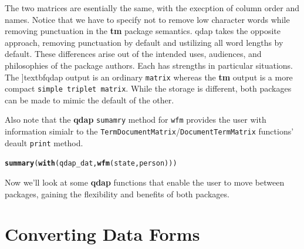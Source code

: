 \documentclass{article}\usepackage[]{graphicx}\usepackage[]{color}
\makeatletter
\newcommand{\hlstd}[1]{\textcolor[rgb]{0.345,0.345,0.345}{#1}}%
\newcommand{\hlkwd}[1]{\textcolor[rgb]{0.737,0.353,0.396}{\textbf{#1}}}%
\newenvironment{kframe}{%
 \def\at@end@of@kframe{}%
 \ifinner\ifhmode%
  \def\at@end@of@kframe{\end{minipage}}%
  \begin{minipage}{\columnwidth}%
 \fi\fi%
 \def\FrameCommand##1{\hskip\@totalleftmargin \hskip-\fboxsep
 \colorbox{shadecolor}{##1}\hskip-\fboxsep
     \hskip-\linewidth \hskip-\@totalleftmargin \hskip\columnwidth}%
 \MakeFramed {\advance\hsize-\width
   \@totalleftmargin\z@ \linewidth\hsize
   \@setminipage}}%
 {\par\unskip\endMakeFramed%
 \at@end@of@kframe}
\newenvironment{knitrout}{}{} %
\makeatother
\begin{document}
The two matrices are esentially the same, with the execption of column order and names.  Notice that we have to specify not to remove low character words while removing punctuation in the \textbf{tm} package semantics.  qdap takes the opposite approach, removing punctuation by default and ustilizing all word lengths by default.  These differences arise out of the intended uses, audiences, and philosophies of the package authors.  Each has strengths in particular situations.  The ]textbf{qdap} output is an ordinary \texttt{matrix} whereas the \textbf{tm} output is a more compact \texttt{simple triplet matrix}.  While the storage is different, both packages can be made to mimic the default of the other.  

Also note that the \textbf{qdap} \texttt{sumamry} method for \texttt{wfm} provides the user with information simialr to the \texttt{TermDocumentMatrix}/\texttt{DocumentTermMatrix} functions' deault \texttt{print} method.

\begin{knitrout}
\color{fgcolor}\begin{kframe}
\begin{alltt}
\hlkwd{summary}\hlstd{(}\hlkwd{with}\hlstd{(qdap_dat,} \hlkwd{wfm}\hlstd{(state, person)))}
\end{alltt}


{\ttfamily\noindent\itshape\color{messagecolor}{\#\# A word-frequency matrix (16 terms, 5 groups)\\\#\# \\\#\# \\\#\# Non-/sparse entries\ \ \ \ \ \  : 17/63\\\#\# Sparsity\ \ \ \ \ \ \ \ \ \ \ \ \ \ \ \ \ \ : 79\%\\\#\# Maximal term length\ \ \ \ \ \  : 8\\\#\# Less than four characters : 56\%\\\#\# Hapax legomenon\ \ \ \ \ \ \ \ \ \  : 13(81\%)\\\#\# Dis legomenon\ \ \ \ \ \ \ \ \ \ \ \  : 3(19\%)\\\#\# Shannon's diversity index : 2.73}}\end{kframe}
\end{knitrout}


Now we'll look at some \textbf{qdap} functions that enable the user to move between packages, gaining the flexibility and benefits of both packages.


\section{Converting Data Forms}
\end{document}
